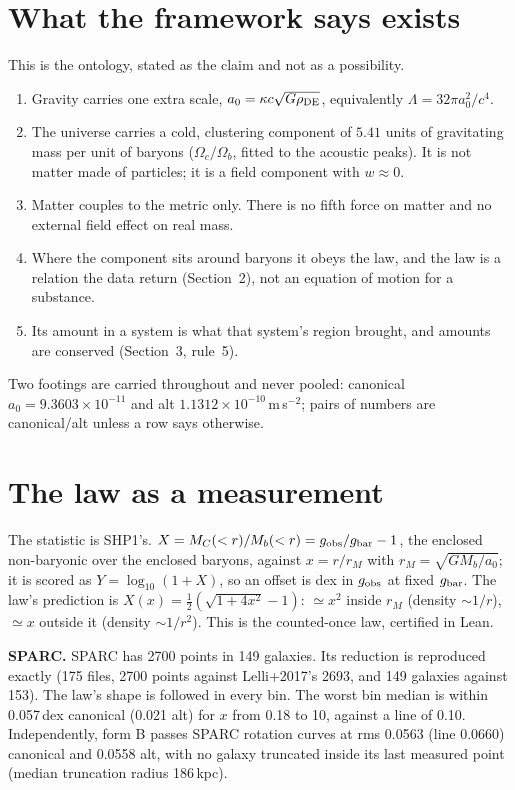 \documentclass[10pt]{article}
\begin{document}
\section{What the framework says exists}
This is the ontology, stated as the claim and not as a possibility.

\begin{enumerate}
\item Gravity carries one extra scale, $a_0=\kappa c\sqrt{G\rho_{\rm DE}}$, equivalently $\Lambda=32\pi a_0^2/c^4$.
\item The universe carries a cold, clustering component of $5.41$ units of gravitating mass per unit of baryons
  ($\Omega_c/\Omega_b$, fitted to the acoustic peaks). It is not matter made of particles; it is a field component with
  $w\approx0$.
\item Matter couples to the metric only. There is no fifth force on matter and no external field effect on real mass.
\item Where the component sits around baryons it obeys the law, and the law is a relation the data return
  (Section~2), not an equation of motion for a substance.
\item Its amount in a system is what that system's region brought, and amounts are conserved (Section~3, rule~5).
\end{enumerate}

Two footings are carried throughout and never pooled: canonical $a_0=9.3603\times10^{-11}$ and alt
$1.1312\times10^{-10}$\,m\,s$^{-2}$; pairs of numbers are canonical/alt unless a row says otherwise.

\section{The law as a measurement}
The statistic is SHP1's. $X=M_C(<r)/M_b(<r)=g_{\rm obs}/g_{\rm bar}-1$, the enclosed non-baryonic over the enclosed
baryons, against $x=r/r_M$ with $r_M=\sqrt{GM_b/a_0}$; it is scored as $Y=\log_{10}(1+X)$, so an offset is dex in
$g_{\rm obs}$ at fixed $g_{\rm bar}$. The law's prediction is
$X(x)=\tfrac12(\sqrt{1+4x^2}-1)$: $\simeq x^2$ inside $r_M$ (density $\sim1/r$), $\simeq x$ outside it
(density $\sim1/r^2$). This is the counted-once law, certified in Lean.

\textbf{SPARC.} SPARC has 2700 points in 149 galaxies. Its reduction is reproduced exactly (175 files, 2700 points against
Lelli+2017's 2693, and 149 galaxies against 153). The law's shape is followed in every bin. The worst bin median is within
0.057\,dex canonical (0.021 alt) for $x$ from 0.18 to 10, against a line of 0.10. Independently, form B passes
SPARC rotation curves at rms 0.0563 (line 0.0660) canonical and 0.0558 alt, with no galaxy truncated inside its
last measured point (median truncation radius 186\,kpc).
\end{document}
